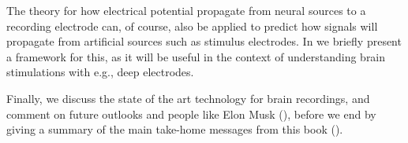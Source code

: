 The theory for how electrical potential propagate from neural sources to a recording electrode can, of course, also be applied to predict how signals will propagate from artificial sources such as stimulus electrodes. In  we briefly present a framework for this, as it will be useful in the context of understanding brain stimulations with e.g., deep electrodes.

Finally, we discuss the state of the art technology for brain recordings, and comment on future outlooks and people like Elon Musk (), before we end  by giving a summary of the main take-home messages from this book ().
